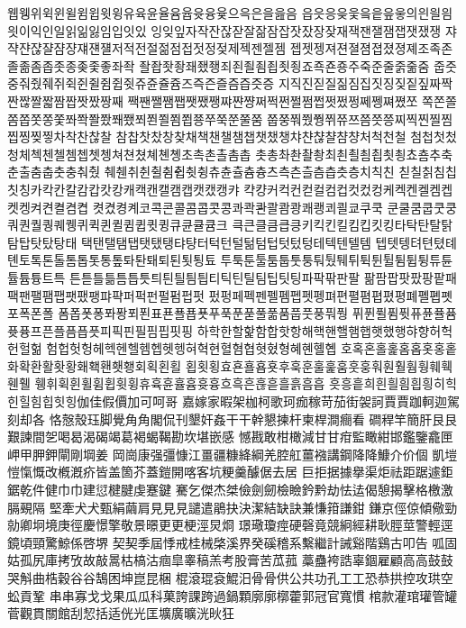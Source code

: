 웹웽위윅윈윌윔윕윗윙유육윤율윰윱윳융윷으윽은을읊음
읍읏응읒읓읔읕읖읗의읜읠읨읫이익인일읽읾잃임입잇있
잉잊잎자작잔잖잗잘잚잠잡잣잤장잦재잭잰잴잼잽잿쟀쟁
쟈쟉쟌쟎쟐쟘쟝쟤쟨쟬저적전절젊점접젓정젖제젝젠젤젬
젭젯젱져젼졀졈졉졌졍졔조족존졸졺좀좁좃종좆좇좋좌좍
좔좝좟좡좨좼좽죄죈죌죔죕죗죙죠죡죤죵주죽준줄줅줆줌
줍줏중줘줬줴쥐쥑쥔쥘쥠쥡쥣쥬쥰쥴쥼즈즉즌즐즘즙즛증
지직진짇질짊짐집짓징짖짙짚짜짝짠짢짤짧짬짭짯짰짱째
짹짼쨀쨈쨉쨋쨌쨍쨔쨘쨩쩌쩍쩐쩔쩜쩝쩟쩠쩡쩨쩽쪄쪘쪼
쪽쫀쫄쫌쫍쫏쫑쫓쫘쫙쫠쫬쫴쬈쬐쬔쬘쬠쬡쭁쭈쭉쭌쭐쭘
쭙쭝쭤쭸쭹쮜쮸쯔쯤쯧쯩찌찍찐찔찜찝찡찢찧차착찬찮찰
참찹찻찼창찾채책챈챌챔챕챗챘챙챠챤챦챨챰챵처척천철
첨첩첫첬청체첵첸첼쳄쳅쳇쳉쳐쳔쳤쳬쳰촁초촉촌촐촘촙
촛총촤촨촬촹최쵠쵤쵬쵭쵯쵱쵸춈추축춘출춤춥춧충춰췄
췌췐취췬췰췸췹췻췽츄츈츌츔츙츠측츤츨츰츱츳층치칙친
칟칠칡침칩칫칭카칵칸칼캄캅캇캉캐캑캔캘캠캡캣캤캥캬
캭컁커컥컨컫컬컴컵컷컸컹케켁켄켈켐켑켓켕켜켠켤켬켭
켯켰켱켸코콕콘콜콤콥콧콩콰콱콴콸쾀쾅쾌쾡쾨쾰쿄쿠쿡
쿤쿨쿰쿱쿳쿵쿼퀀퀄퀑퀘퀭퀴퀵퀸퀼큄큅큇큉큐큔큘큠크
큭큰클큼큽킁키킥킨킬킴킵킷킹타탁탄탈탉탐탑탓탔탕태
택탠탤탬탭탯탰탱탸턍터턱턴털턺텀텁텃텄텅테텍텐텔템
텝텟텡텨텬텼톄톈토톡톤톨톰톱톳통톺톼퇀퇘퇴퇸툇툉툐
투툭툰툴툼툽툿퉁퉈퉜퉤튀튁튄튈튐튑튕튜튠튤튬튱트특
튼튿틀틂틈틉틋틔틘틜틤틥티틱틴틸팀팁팃팅파팍팎판팔
팖팜팝팟팠팡팥패팩팬팰팸팹팻팼팽퍄퍅퍼퍽펀펄펌펍펏
펐펑페펙펜펠펨펩펫펭펴편펼폄폅폈평폐폘폡폣포폭폰폴
폼폽폿퐁퐈퐝푀푄표푠푤푭푯푸푹푼푿풀풂품풉풋풍풔풩
퓌퓐퓔퓜퓟퓨퓬퓰퓸퓻퓽프픈플픔픕픗피픽핀필핌핍핏핑
하학한할핥함합핫항해핵핸핼햄햅햇했행햐향허헉헌헐헒
험헙헛헝헤헥헨헬헴헵헷헹혀혁현혈혐협혓혔형혜혠혤혭
호혹혼홀홅홈홉홋홍홑화확환활홧황홰홱홴횃횅회획횐횔
횝횟횡효횬횰횹횻후훅훈훌훑훔훗훙훠훤훨훰훵훼훽휀휄
휑휘휙휜휠휨휩휫휭휴휵휸휼흄흇흉흐흑흔흖흗흘흙흠흡
흣흥흩희흰흴흼흽힁히힉힌힐힘힙힛힝伽佳假價加可呵哥
嘉嫁家暇架枷柯歌珂痂稼苛茄街袈訶賈賈跏軻迦駕刻却各
恪慤殼珏脚覺⾓角閣侃刊墾奸姦⼲干幹懇揀杆柬桿澗癎看
磵稈竿簡肝⾉艮艱諫間乫喝曷渴碣竭葛褐蝎鞨勘坎堪嵌感
憾戡敢柑橄減⽢甘疳監瞰紺邯鑑鑒龕匣岬甲胛鉀閘剛堈姜
岡崗康强彊慷江畺疆糠絳綱羌腔舡薑襁講鋼降降鱇介价個
凱塏愷愾慨改槪漑疥皆盖箇芥蓋鎧開喀客坑粳羹醵倨去居
巨拒据據擧渠炬祛距踞遽鉅鋸乾件健⼱巾建愆楗腱虔蹇鍵
騫乞傑杰桀儉劍劒檢瞼鈐黔劫怯迲偈憩揭擊格檄激膈覡隔
堅牽⽝犬甄絹繭肩⾒見見譴遣鵑抉決潔結缺訣兼慊箝謙鉗
鎌京俓倞傾儆勁勍卿坰境庚徑慶憬擎敬景暻更更梗涇炅烱
璟璥瓊痙硬磬竟競絅經耕耿脛莖警輕逕鏡頃頸驚鯨係啓堺
契契季屆悸戒桂械棨溪界癸磎稽系繫繼計誡谿階鷄古叩告
呱固姑孤尻庫拷攷故敲暠枯槁沽痼皐睾稿羔考股膏苦苽菰
藁蠱袴誥辜錮雇顧⾼高⿎鼓哭斛曲梏穀⾕谷鵠困坤崑昆梱
棍滾琨袞鯤汨⾻骨供公共功孔⼯工恐恭拱控攻珙空蚣貢鞏
串串寡⼽戈果⽠瓜科菓誇課跨過鍋顆廓廓槨藿郭冠官寬慣
棺款灌琯瓘管罐菅觀貫關館刮恝括适侊光匡壙廣曠洸炚狂

